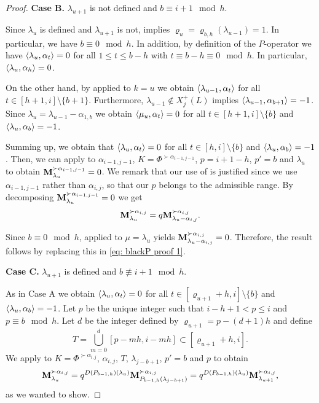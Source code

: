 \begin{proof}
\medskip
\textbf{Case B. }  $\lambda_{u+1}$ is not defined and $b\equiv i+1 \mod h$.
\medskip


Since $\lambda_{u}$ is defined and  $\lambda_{u+1}$ is not,  implies  $\varrho_{u} = \varrho_{b,h}(\lambda_{u-1}) = 1$. 
In particular, we have $b\equiv 0 \mod h$.
In addition, by definition of the $P$-operator we have $\langle \lambda_{u} , \alpha_{t} \rangle=0$ for all $1\leq t \leq b-h $ with $t\equiv b-h \equiv 0 \mod h$. 
In particular, $\langle \lambda_{u} , \alpha_{h} \rangle=0$. 

On the other hand, by   applied to $k=u$ we obtain 
$\langle \lambda_{u-1} , \alpha_{t} \rangle$ for all $t\in [h+1, i] \setminus \{b+1\}$. 
Furthermore, $\lambda_{u-1}\notin X_j^{+}(L)$ implies $\langle \lambda_{u-1} , \alpha_{b+1} \rangle=-1$. 
Since $\lambda_u= \lambda_{u-1}- \alpha_{1,b}$ we obtain  $\langle \mu_u , \alpha_t \rangle=0$ for all $t\in  [h+1,i]\setminus\{b\}$ and $\langle \lambda_{u} , \alpha_{b} \rangle = -1$.

Summing up, we obtain that $\langle \lambda_u , \alpha_t \rangle=0$ for all $t\in  [h,i]\setminus\{b\}$ and $\langle \lambda_{u} , \alpha_{b} \rangle = -1$.
Then, we can apply   to $\alpha_{i-1,j-1}$, $K=\Phi^{\succ \alpha_{i-1,j-1}}$, $p =i+1-h$, $p'=b$ and $\lambda_{u}$ to obtain $\mathbf{M}_{\lambda_{u}}^{\succ \alpha_{i-1,j-1}} = 0$. 
We remark that our use of  is justified since we use $\alpha_{i-1,j-1}$ rather than $\alpha_{i,j}$, so that our $p$ belongs to the admissible range.
By decomposing $\mathbf{M}_{\lambda_{u}}^{\succ \alpha_{i-1,j-1}} = 0$ we get
    \begin{equation}\label{eq: blackP proof 1}
        \mathbf{M}_{\lambda_{u}}^{\succ \alpha_{i,j}} =q \mathbf{M}_{\lambda_{u} - \alpha_{i,j}}^{\succ \alpha_{i,j}}.
    \end{equation}

Since $b\equiv 0 \mod h$,   applied to $\mu = \lambda_{u}$ yields  $\mathbf{M}_{\lambda_{u} - \alpha_{i,j}}^{\succ \alpha_{i,j}} = 0$. 
Therefore, the result follows by replacing this in \eqref{eq: blackP proof 1}.

\medskip
\textbf{Case C.}  $\lambda_{u+1}$ is defined and $b \not \equiv i+1 \mod h$.
\medskip

As in Case A we obtain  $\langle \lambda_{u} , \alpha_{t} \rangle = 0$ for all $t\in [\varrho_{u+1}+h,i]\setminus \{b\}$ and  $\langle \lambda_{u} , \alpha_{b} \rangle = -1$.
    Let $p$ be  the unique integer such that  $i-h+1< p\leq i$ and $p\equiv b \mod h$.
    Let $d$ be the integer defined by $\varrho_{u+1} = p-(d+1)h$ and define
    \begin{equation}
        T = \bigcup_{m = 0}^{d}[p-mh,i-mh]\subset [\varrho_{u+1} +h,i].
    \end{equation}
   We apply   to  $K=\Phi^{\succ \alpha_{i,j}}$, $\alpha_{i,j}$, $T$, $\lambda_{j-b+1}$, $p' = b$ and $p$ to obtain
\begin{equation}
    \mathbf{M}_{\lambda_u}^{\succ\alpha_{i,j}} =q^{D(P_{b-1,h})(\lambda_{u})}  \mathbf{M}_{P_{b-1,h}(\lambda_{j-b+1})}^{\succ \alpha_{i,j}} =q^{D(P_{b-1,h})(\lambda_{u})}  \mathbf{M}_{\lambda_{u+1}}^{\succ \alpha_{i,j}} ,
\end{equation}
as we wanted to show. 


\end{proof}
